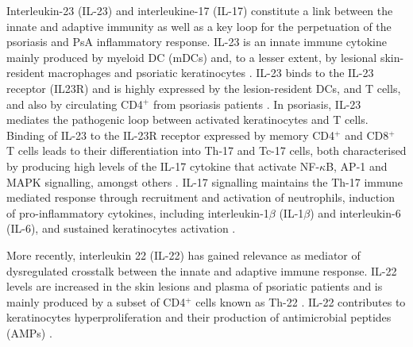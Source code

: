 Interleukin-23 (IL-23) and interleukine-17 (IL-17) constitute a link between the innate and adaptive immunity as well as a key loop for the perpetuation of the psoriasis and PsA inflammatory response. IL-23 is an innate immune cytokine mainly produced by myeloid DC (mDCs) and, to a lesser extent, by lesional skin-resident macrophages and psoriatic keratinocytes \parencite{Lee2004, Li2018}. IL-23 binds to the IL-23 receptor (IL23R) and is highly expressed by the lesion-resident DCs, and T cells, and also by circulating CD4$^+$ from psoriasis patients  \parencite{Tonel2010}. In psoriasis, IL-23 mediates the pathogenic loop between activated keratinocytes and T cells. Binding of IL-23 to the IL-23R receptor expressed by memory CD4$^+$ and CD8$^+$ T cells leads to their differentiation into Th-17 and Tc-17 cells, both characterised by producing high levels of the IL-17 cytokine that activate NF-$\kappa$B, AP-1 and MAPK signalling, amongst others \parencite{McGeachy2009}. %
IL-17 signalling maintains the Th-17 immune mediated response through recruitment and activation of neutrophils, induction of pro-inflammatory cytokines, including interleukin-1$\beta$ (IL-1$\beta$) and interleukin-6 (IL-6), and sustained keratinocytes activation \parencite{Doyle2012}.

More recently, interleukin 22 (IL-22) has gained relevance as mediator of dysregulated crosstalk between the innate and adaptive immune response. IL-22 levels are increased in the skin lesions and plasma of psoriatic patients and is mainly produced by a subset of CD4$^+$ cells known as Th-22 \parencite{Wolk2006}. IL-22 contributes to keratinocytes hyperproliferation and their production of antimicrobial peptides (AMPs)  \parencite{Eyerich2009}.


